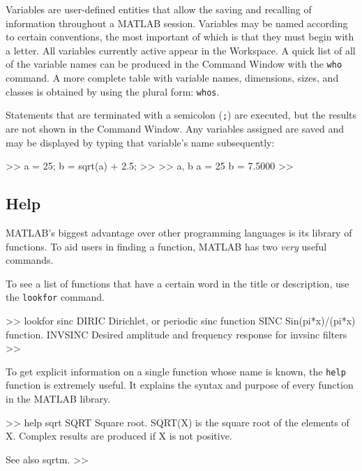 \par
Variables are user-defined entities that allow the saving and recalling of information throughout a MATLAB session.  Variables may be named according to certain conventions, the most important of which is that they must begin with a letter.  All variables currently active appear in the Workspace.  A quick list of all of the variable names can be produced in the Command Window with the \verb=who= command.  A more complete table with variable names, dimensions, sizes, and classes is obtained by using the plural form: \verb=whos=.
\par
Statements that are terminated with a semicolon (\verb=;=) are executed, but the results are not shown in the Command Window.  Any variables assigned are saved and may be displayed by typing that variable's name subsequently:

\begin{codex}
>> a = 25; b = sqrt(a) + 2.5;
>>
>> a, b
a =
        25
b =
        7.5000
>>
\end{codex}

\subsection{Help}
MATLAB's biggest advantage over other programming languages is its library of functions.  To aid users in finding a function, MATLAB has two \textit{very} useful commands.
\par
To see a list of functions that have a certain word in the title or description, use the \verb=lookfor= command.

\begin{codex}
>> lookfor sinc
DIRIC   Dirichlet, or periodic sinc function
SINC    Sin(pi*x)/(pi*x) function.
INVSINC Desired amplitude and frequency response for invsinc
        filters
>>
\end{codex}

\par
To get explicit information on a single function whose name is known, the \verb=help= function is extremely useful.  It explains the syntax and purpose of every function in the MATLAB library.

\begin{codex}
>> help sqrt
SQRT        Square root.
    SQRT(X) is the square root of the elements of X.  Complex
    results are produced if X is not positive.

    See also sqrtm.
>>
\end{codex}

